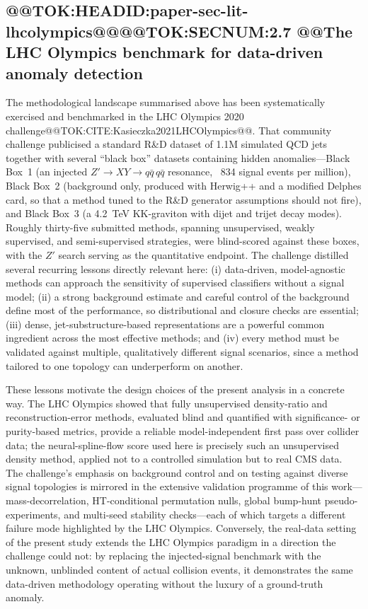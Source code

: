 \documentclass[11pt]{article}
\begin{document}
\subsection{@@TOK:HEADID:paper-sec-lit-lhcolympics@@@@TOK:SECNUM:2.7 @@The LHC Olympics benchmark for data-driven anomaly detection}

The methodological landscape summarised above has been systematically exercised and benchmarked in the LHC Olympics 2020 challenge@@TOK:CITE:Kasieczka2021LHCOlympics@@. That community challenge publicised a standard R\&D dataset of 1.1M simulated QCD jets together with several ``black box'' datasets containing hidden anomalies---Black Box~1 (an injected $Z'\to XY\to q\bar{q}\,q\bar{q}$ resonance, ~834 signal events per million), Black Box~2 (background only, produced with Herwig++ and a modified Delphes card, so that a method tuned to the R\&D generator assumptions should not fire), and Black Box~3 (a 4.2~TeV KK-graviton with dijet and trijet decay modes). Roughly thirty-five submitted methods, spanning unsupervised, weakly supervised, and semi-supervised strategies, were blind-scored against these boxes, with the $Z'$ search serving as the quantitative endpoint. The challenge distilled several recurring lessons directly relevant here: (i) data-driven, model-agnostic methods can approach the sensitivity of supervised classifiers without a signal model; (ii) a strong background estimate and careful control of the background define most of the performance, so distributional and closure checks are essential; (iii) dense, jet-substructure-based representations are a powerful common ingredient across the most effective methods; and (iv) every method must be validated against multiple, qualitatively different signal scenarios, since a method tailored to one topology can underperform on another.

These lessons motivate the design choices of the present analysis in a concrete way. The LHC Olympics showed that fully unsupervised density-ratio and reconstruction-error methods, evaluated blind and quantified with significance- or purity-based metrics, provide a reliable model-independent first pass over collider data; the neural-spline-flow score used here is precisely such an unsupervised density method, applied not to a controlled simulation but to real CMS data. The challenge's emphasis on background control and on testing against diverse signal topologies is mirrored in the extensive validation programme of this work---mass-decorrelation, HT-conditional permutation nulls, global bump-hunt pseudo-experiments, and multi-seed stability checks---each of which targets a different failure mode highlighted by the LHC Olympics. Conversely, the real-data setting of the present study extends the LHC Olympics paradigm in a direction the challenge could not: by replacing the injected-signal benchmark with the unknown, unblinded content of actual collision events, it demonstrates the same data-driven methodology operating without the luxury of a ground-truth anomaly.
\end{document}
